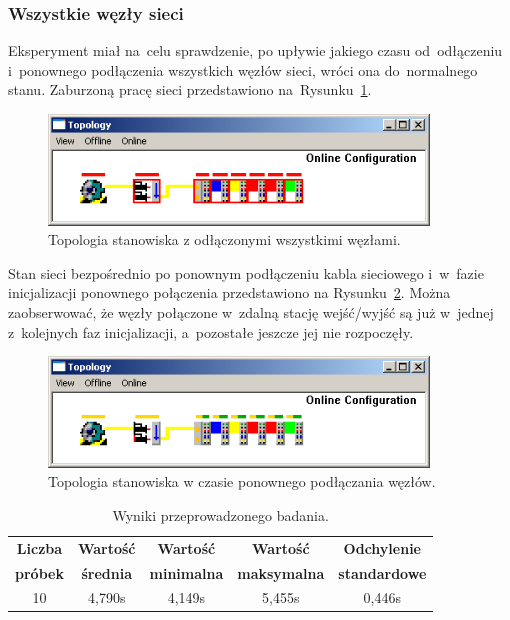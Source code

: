 \subsubsection{Wszystkie węzły sieci}
\label{badania:cala_siec}
Eksperyment miał na~celu sprawdzenie, po upływie jakiego czasu od~odłączeniu i~ponownego podłączenia wszystkich węzłów sieci, wróci ona do~normalnego stanu. Zaburzoną pracę sieci przedstawiono na~Rysunku~\ref{topologyCPallerror}.
\begin{figure}[!htb] 	\centering 	\includegraphics[width=0.9\textwidth]{images/topologyCPallerror} \caption{Topologia stanowiska z odłączonymi wszystkimi węzłami.} \label{topologyCPallerror} \end{figure}

\noindent Stan sieci bezpośrednio po ponownym podłączeniu kabla sieciowego i~w~fazie inicjalizacji ponownego połączenia przedstawiono na Rysunku~\ref{topologyCPallloading}. Można zaobserwować, że węzły połączone w~zdalną stację wejść/wyjść są już w~jednej z~kolejnych faz inicjalizacji, a~pozostałe jeszcze jej nie rozpoczęły.
\begin{figure}[!htb] 	\centering 	\includegraphics[width=0.9\textwidth]{images/topologyCPallloading} \caption{Topologia stanowiska w czasie ponownego podłączania węzłów.} \label{topologyCPallloading} \end{figure}

\begin{table}[!htb]
\begin{center}
\begin{tabular}{| c | c | c | c | c |}\hline
\textbf{Liczba} & \textbf{Wartość} & \textbf{Wartość} & \textbf{Wartość} & \textbf{Odchylenie} \\
\textbf{próbek} & \textbf{średnia} & \textbf{minimalna} & \textbf{maksymalna} & \textbf{standardowe} \\\hline\hline
10 & 4,790s & 4,149s & 5,455s & 0,446s\\\hline
\end{tabular}
\end{center}
\vspace*{-6mm}
  \caption{Wyniki przeprowadzonego badania.}
	\label{badania:wyniki:stabilizacja_siec}
\end{table}

